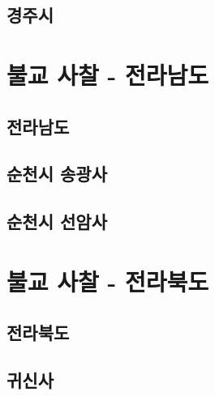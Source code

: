 \documentclass[12pt, a4paper, oneside]{book}
\begin{document}
	\chapter{ 경주시 }


	\part{불교 사찰 - 전라남도}
	\noptcrule
	\parttoc				


	\chapter{ 전라남도 }


	\chapter{ 순천시 송광사 }


	\chapter{ 순천시 선암사 }



	\part{불교 사찰 - 전라북도}
	\noptcrule
	\parttoc				


	\chapter{전라북도}

	\chapter{귀신사}
\end{document}
